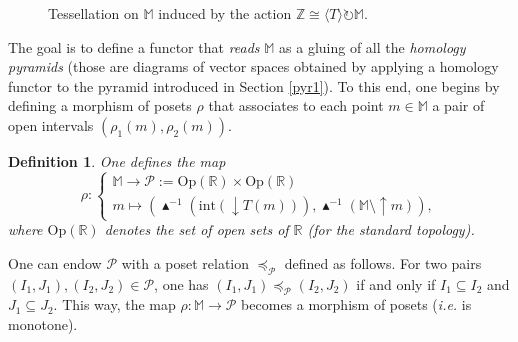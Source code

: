 \documentclass[11pt]{article}
\newtheorem{definition}[theorem]{Definition}
\theoremstyle{remark}
\newcommand{\Z}{\mathbb{Z}}
\newcommand{\R}{\mathbb{R}}
\newcommand{\M}{\mathbb{M}}
\begin{document}
\begin{figure}

\caption{Tessellation on $\M$ induced by the action $\Z\cong \langle T\rangle\circlearrowright\M$.}
    \label{fig:tessellation}
\end{figure}

\noindent The goal is to define a functor that \textit{reads} $\M$ as a gluing of all the \textit{homology pyramids} (those are diagrams of vector spaces obtained by applying a homology functor to the pyramid introduced in Section \ref{pyr1}). To this end, one begins by defining a morphism of posets $\rho$ that associates to each point $m\in\M$ a pair of open intervals $(\rho_1(m),\rho_2(m))$.

\begin{definition}
\label{rho_def}
One defines the map 
\begin{equation*}\rho:
\begin{cases}
             \M\rightarrow \mathcal{P}:=\mathrm{Op}(\R)\times\mathrm{Op}(\R)\\
             m\mapsto \left(\blacktriangle^{-1}(\mathrm{int}(\downarrow T(m))),\blacktriangle^{-1}(\M\setminus\uparrow m)\right),
       \end{cases}
\end{equation*}
where $\mathrm{Op}(\R)$ denotes the set of open sets of $\R$ (for the standard topology).
\end{definition}

\noindent One can endow $\mathcal{P}$ with a poset relation $\preceq_{\mathcal{P}}$ defined as follows. For two pairs $(I_1,J_1), (I_2,J_2)\in\mathcal{P}$, one has $(I_1,J_1)\preceq_{\mathcal{P}} (I_2,J_2)$ if and only if $I_1\subseteq I_2$ and $J_1\subseteq J_2$. This way, the map $\rho:\M\rightarrow\mathcal{P}$ becomes a morphism of posets (\textit{i.e.} is monotone).
\end{document}
